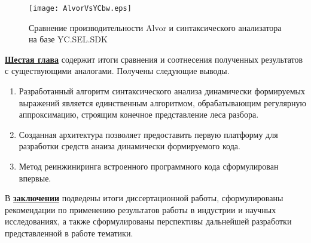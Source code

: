 \begin{figure}[]
 \centering
 \texttt{[image: AlvorVsYCbw.eps]}
 \caption{Сравнение производительности Alvor и синтаксического анализатора на базе YC.SEL.SDK}
 \label{fig:YCvsAlvor}
\end{figure}

\underline{\textbf{Шестая глава}} содержит итоги сравнения и соотнесения полученных результатов с существующими аналогами. Получены следующие выводы.
\begin{enumerate}
    \item Разработанный алгоритм синтаксического анализа динамически формируемых выражений является единственным алгоритмом, обрабатывающим регулярную аппроксимацию, строящим конечное представление леса разбора.
    \item Созданная архитектура позволяет предоставить первую платформу для разработки средств анаиза динамически формируемого кода.
    \item Метод реинжиниринга встроенного программного кода сформулирован впервые.
\end{enumerate}



В \underline{\textbf{заключении}} подведены итоги диссертационной работы, сформулированы рекомендации по применению результатов работы в индустрии и научных исследованиях, а также сформулированы перспективы дальнейшей разработки представленной в работе тематики.

\newpage
\renewcommand{\refname}{\Large Публикации автора по теме диссертации}

